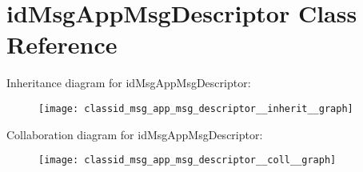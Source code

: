 \hypertarget{classid_msg_app_msg_descriptor}{}\section{id\+Msg\+App\+Msg\+Descriptor Class Reference}
\label{classid_msg_app_msg_descriptor}


Inheritance diagram for id\+Msg\+App\+Msg\+Descriptor\+:
\nopagebreak
\begin{figure}[H]
\begin{center}
\leavevmode
\texttt{[image: classid\_msg\_app\_msg\_descriptor\_\_inherit\_\_graph]}
\end{center}
\end{figure}


Collaboration diagram for id\+Msg\+App\+Msg\+Descriptor\+:
\nopagebreak
\begin{figure}[H]
\begin{center}
\leavevmode
\texttt{[image: classid\_msg\_app\_msg\_descriptor\_\_coll\_\_graph]}
\end{center}
\end{figure}
